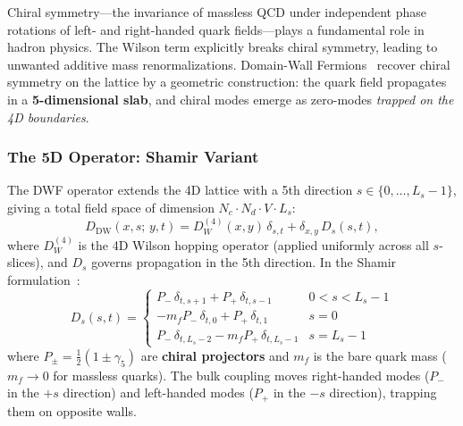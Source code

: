 \documentclass[12pt,a4paper]{article}
\begin{document}
Chiral symmetry---the invariance of massless QCD under independent phase
rotations of left- and right-handed quark fields---plays a fundamental role
in hadron physics.
The Wilson term explicitly breaks chiral symmetry, leading to unwanted
additive mass renormalizations.
Domain-Wall Fermions~\cite{Kaplan1992,Shamir1993} recover chiral symmetry
on the lattice by a geometric construction: the quark field propagates
in a \textbf{5-dimensional slab}, and chiral modes emerge as
zero-modes \emph{trapped on the 4D boundaries}.

\subsubsection{The 5D Operator: Shamir Variant}

The DWF operator extends the 4D lattice with a 5th direction $s \in \{0,\ldots,L_s-1\}$,
giving a total field space of dimension $N_c \cdot N_d \cdot V \cdot L_s$:
\begin{equation}
  D_{\mathrm{DW}}(x,s;\,y,t)
  = D_W^{(4)}(x,y)\,\delta_{s,t}
  + \delta_{x,y}\,D_s(s,t),
  \label{eq:dwf_op}
\end{equation}
where $D_W^{(4)}$ is the 4D Wilson hopping operator (applied uniformly across
all $s$-slices), and $D_s$ governs propagation in the 5th direction.
In the Shamir formulation~\cite{Shamir1993}:
\begin{equation}
  D_s(s,t) = \begin{cases}
  P_- \,\delta_{t,s+1} + P_+ \,\delta_{t,s-1} & 0 < s < L_s-1 \\
  -m_f P_- \,\delta_{t,0} + P_+ \,\delta_{t,1} & s = 0 \\
  P_- \,\delta_{t,L_s-2} - m_f P_+ \,\delta_{t,L_s-1} & s = L_s-1
  \end{cases}
  \label{eq:ds_matrix}
\end{equation}
where $P_\pm = \tfrac{1}{2}(1\pm\gamma_5)$ are \textbf{chiral projectors} and
$m_f$ is the bare quark mass ($m_f \to 0$ for massless quarks).
The bulk coupling moves right-handed modes ($P_-$ in the $+s$ direction)
and left-handed modes ($P_+$ in the $-s$ direction), trapping them
on opposite walls.
\end{document}
